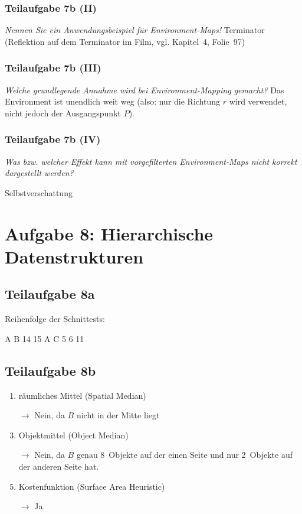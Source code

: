 \documentclass[a4paper]{scrartcl}
\begin{document}
\subsubsection*{Teilaufgabe 7b (II)}
\textit{Nennen Sie ein Anwendungsbeispiel für Environment-Maps!}
Terminator (Reflektion auf dem Terminator im Film, vgl. Kapitel~4, Folie~97)

\subsubsection*{Teilaufgabe 7b (III)}
\textit{Welche grundlegende Annahme wird bei Environment-Mapping gemacht?}
Das Environment ist unendlich weit weg (also: nur die Richtung $r$ wird verwendet,
nicht jedoch der Ausgangspunkt $P$).

\subsubsection*{Teilaufgabe 7b (IV)}
\textit{Was bzw. welcher Effekt kann mit vorgefilterten Environment-Maps nicht korrekt dargestellt werden?}

Selbstverschattung


\section*{Aufgabe 8: Hierarchische Datenstrukturen}
\subsection*{Teilaufgabe 8a}

Reihenfolge der Schnittests:

A B 14 15 A C 5 6 11

\subsection*{Teilaufgabe 8b}
\begin{enumerate}
    \item räumliches Mittel (Spatial Median)
    \item[$\rightarrow$] Nein, da $B$ nicht in der Mitte liegt
    \item Objektmittel (Object Median)
    \item[$\rightarrow$] Nein, da $B$ genau 8~Objekte auf der einen Seite und
                         nur 2~Objekte auf der anderen Seite hat.
    \item Kostenfunktion (Surface Area Heuristic)
    \item[$\rightarrow$] Ja.
\end{enumerate}
\end{document}
